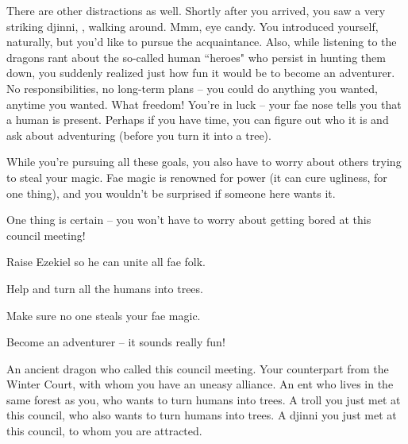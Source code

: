 \documentclass[char]{guildcamp2}
\begin{document}
There are other distractions as well.  Shortly after you arrived, you saw a very striking djinni, \cWizard{}, walking around.  Mmm, eye candy.  You introduced yourself, naturally, but you'd like to pursue the acquaintance.  Also, while listening to the dragons rant about the so-called human ``heroes" who persist in hunting them down, you suddenly realized just how fun it would be to become an adventurer.  No responsibilities, no long-term plans -- you could do anything you wanted, anytime you wanted.  What freedom!  You're in luck -- your fae nose tells you that a human is present.  Perhaps if you have time, you can figure out who it is and ask about adventuring (before you turn it into a tree).  

While you're pursuing all these goals, you also have to worry about others trying to steal your magic.  Fae magic is renowned for power (it can cure ugliness, for one thing), and you wouldn't be surprised if someone here wants it.

One thing is certain -- you won't have to worry about getting bored at this council meeting!


 
\begin{itemz}[Goals]
  \item Raise Ezekiel so he can unite all fae folk.
  \item Help \cEnt{\intro} and \cTroll{\intro} turn all the humans into trees.
  \item Make sure no one steals your fae magic.
  \item Become an adventurer -- it sounds really fun!
\end{itemz}


\begin{contacts}
  \contact{\cOnyx{}} An ancient dragon who called this council meeting.
  \contact{\cBabyFae{}} Your counterpart from the Winter Court, with whom you have an uneasy alliance.
  \contact{\cEnt{}} An ent who lives in the same forest as you, who wants to turn humans into trees.
  \contact{\cTroll{}} A troll you just met at this council, who also wants to turn humans into trees.
  \contact{\cWizard{}} A djinni you just met at this council, to whom you are attracted.
\end{contacts}



\end{document}
